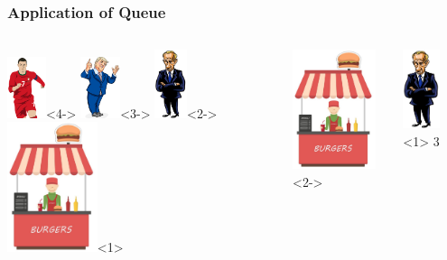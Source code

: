 \begin{frame}
\frametitle{Application of Queue}

\begin{columns}

    \includegraphics[height=1.8cm]{Image/ronaldo.png}<4->
    \includegraphics[height=1.8cm]{Image/trump.jpg}<3->
    \includegraphics[height=2.0cm]{Image/putin.jpg}<2->
    \includegraphics[height=3.8cm]{Image/Burger_Stall.jpg}<1>

  \includegraphics[height=3.5cm]{Image/Burger_Stall.jpg}<2->
  \begin{center}
    \includegraphics[height=2.3cm]{Image/putin.jpg}<1>
    $3$
  \end{center}


\end{columns}
\end{frame}
